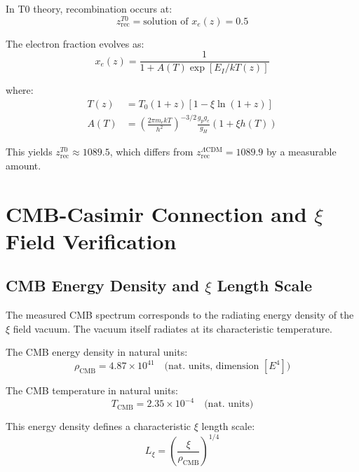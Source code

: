 	In T0 theory, recombination occurs at:
	\begin{equation}
		z_{\text{rec}}^{T0} = \text{solution of } x_e(z) = 0.5
	\end{equation}
	
	The electron fraction evolves as:
	\begin{equation}
		x_e(z) = \frac{1}{1 + A(T) \exp[E_I/kT(z)]}
	\end{equation}
	
	where:
	\begin{align}
		T(z) &= T_0(1+z)[1 - \xi\ln(1+z)] \\
		A(T) &= \left(\frac{2\pi m_e kT}{h^2}\right)^{-3/2} 
		\frac{g_p g_e}{g_H} (1 + \xi h(T))
	\end{align}
	
	This yields $z_{\text{rec}}^{T0} \approx 1089.5$, which differs from 
	$z_{\text{rec}}^{\Lambda\text{CDM}} = 1089.9$ by a measurable amount.
	
	
	\section{CMB-Casimir Connection and $\xi$ Field Verification}
	\label{sec:cmb_casimir}
	
	\subsection{CMB Energy Density and $\xi$ Length Scale}
	
	\begin{revolutionary}
		The measured CMB spectrum corresponds to the radiating energy density of the $\xi$ field vacuum. The vacuum itself radiates at its characteristic temperature.
	\end{revolutionary}
	
	The CMB energy density in natural units:
	\begin{equation}
		\rho_{\text{CMB}} = 4.87 \times 10^{41} \quad \text{(nat. units, dimension } [E^4] \text{)}
	\end{equation}
	
	The CMB temperature in natural units:
	\begin{equation}
		T_{\text{CMB}} = 2.35 \times 10^{-4} \quad \text{(nat. units)}
	\end{equation}
	
	This energy density defines a characteristic $\xi$ length scale:
	\begin{equation}
		L_\xi = \left(\frac{\xi}{\rho_{\text{CMB}}}\right)^{1/4}
	\end{equation}
	

